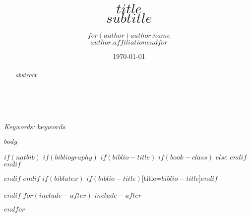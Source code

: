 \documentclass[11pt]{article} %
\title{\textbf{$title$}\\ %
$subtitle$} %
\author{$for(author)$\textsc{$author.name$} %
\\{\textit{$author.affiliation$}}$endfor$
} %
\date{\today} %
\makeatletter
\renewcommand{\maketitle}{ %
\begin{flushright} %
{\LARGE\@title} %

\vspace{50pt} %

{\large\@author} %
\\\@date %

\vspace{40pt} %
\end{flushright}
}
\makeatother
\begin{document}
\maketitle %



\begin{abstract}
$abstract$
\end{abstract}

\hspace*{3,6mm}\textit{Keywords:} $keywords$ %

\vspace{30pt} %


$body$



$if(natbib)$
$if(bibliography)$
$if(biblio-title)$
$if(book-class)$
\renewcommand\bibname{$biblio-title$}
$else$
\renewcommand\refname{$biblio-title$}
$endif$
$endif$


$endif$
$endif$
$if(biblatex)$
\printbibliography$if(biblio-title)$[title=$biblio-title$]$endif$

$endif$
$for(include-after)$
$include-after$

$endfor$

\end{document}
